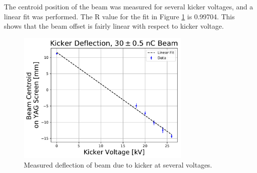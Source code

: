 \fi
The centroid position of the beam was measured for several kicker voltages, and a linear fit was performed.
The R value for the fit in Figure \ref{fig:linear} is 0.99704. This shows that the beam offset 
is fairly linear with respect to kicker voltage. 
\begin{figure}
	\centering
	\includegraphics[width=0.75\textwidth]{./images/kicker_linearity}
	\caption{Measured deflection of beam due to kicker at several voltages.}
	\label{fig:linear}
\end{figure}

